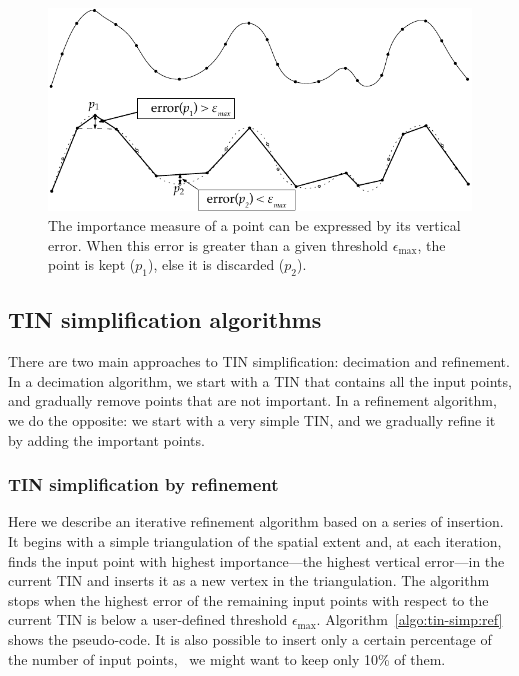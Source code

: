 \begin{figure}
	\centering
	\includegraphics[width=0.85\linewidth]{figs/mesh_simplification}
	\caption{The importance measure of a point can be expressed by its vertical error. When this error is greater than a given threshold $\epsilon_{\max}$, the point is kept ($p_1$), else it is discarded ($p_2$).}%
\label{fig:meshsimplification}
\end{figure}


\subsection{TIN simplification algorithms}

There are two main approaches to TIN simplification: decimation and refinement. 
In a decimation algorithm, we start with a TIN that contains all the input points, and gradually remove points that are not important. 
In a refinement algorithm, we do the opposite: we start with a very simple TIN, and we gradually refine it by adding the important points. 


\subsubsection{TIN simplification by refinement}

Here we describe an iterative refinement algorithm based on a series of insertion.
It begins with a simple triangulation of the spatial extent and, at each iteration, finds the input point with highest importance---the highest vertical error---in the current TIN and inserts it as a new vertex in the triangulation. 
The algorithm stops when the highest error of the remaining input points with respect to the current TIN is below a user-defined threshold $\epsilon_{\max}$. 
Algorithm~\ref{algo:tin-simp:ref} shows the pseudo-code.
It is also possible to insert only a certain percentage of the number of input points, \eg\ we might want to keep only 10\% of them.

